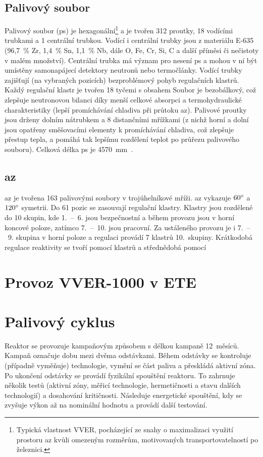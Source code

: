 \subsection{Palivový soubor}
Palivový soubor (\ac{ps}) je hexagonální\footnote{Typická vlastnost VVER, pocházející ze snahy o maximalizaci využití prostoru \ac{az} kvůli omezeným 
rozměrům, motivovaných transportovatelností po železnici.} a je tvořen 312 proutky, 18 vodícími trubkami a 1 centrální trubkou. Vodící i centrální trubky 
jsou z materiálu 
E-635 (96,7~\% Zr, 1,4~\% Sn, 1,1~\% Nb, dále O, Fe, Cr, Si, C a další příměsi či nečistoty v malém množství). Centrální 
trubka má význam pro nesení \ac{ps} a mohou v ní být umístěny 
samonapájecí 
detektory neutronů nebo termočlánky. Vodící trubky zajišťují (na vybraných pozicích) bezproblémový pohyb regulačních klastrů. Každý regulační klastr je 
tvořen 18 tyčemi 
s obsahem  Soubor je 
bezobálkový, což zlepšuje neutronovou bilanci díky menší celkové absorpci 
a termohydraulické charakteristiky (lepší promíchávání chladiva při průtoku \ac{az}). Palivové proutky jsou drženy dolním nátrubkem a 8 distančními 
mřížkami (z nichž horní a dolní jsou opatřeny směšovacími elementy k promíchávání chladiva, což zlepšuje přestup tepla, a pomáhá tak lepšímu 
rozdělení teplot po průřezu palivového souboru). Celková délka \ac{ps} je 4570~mm~\cite{ulmanova_bp, hermansky}.

\subsection{\acl{az}}
\ac{az} je tvořena 163 palivovými soubory v trojúhelníkové mříži. \ac{az} vykazuje $60\degree$ a $120\degree$ symetrii. 
Do 61 pozic se zasouvají regulační klastry. 
Klastry jsou rozdělené do 10 skupin, kde 1.~--~6. jsou bezpečnostní a během provozu jsou v horní koncové poloze, zatímco 7.~--~10. jsou pracovní. Za ustáleného 
provozu je i 7.~--~9. skupina v horní poloze a regulaci provádí 7 klastrů 10.~skupiny. Krátkodobá regulace reaktivity se tvoří pomocí klastrů a  
střednědobá pomocí 

\section{Provoz VVER-1000 v ETE}

\section{Palivový cyklus}
Reaktor se provozuje kampaňovým způsobem s délkou kampaně 12~měsíců. Kampaň označuje dobu mezi dvěma odstávkami. Během odstávky se 
kontroluje (případně vyměňuje) technologie, vymění se část paliva a přeskládá aktivní zóna. Po ukončení odstávky se provádí fyzikální spouštění 
reaktoru. To zahrnuje několik testů (aktivní zóny, měřicí technologie, hermetičnosti a stavu dalších technologií) a dosahování kritičnosti. Následuje energetické 
spouštění, kdy se zvyšuje výkon až na nominální hodnotu a provádí další testování. 

